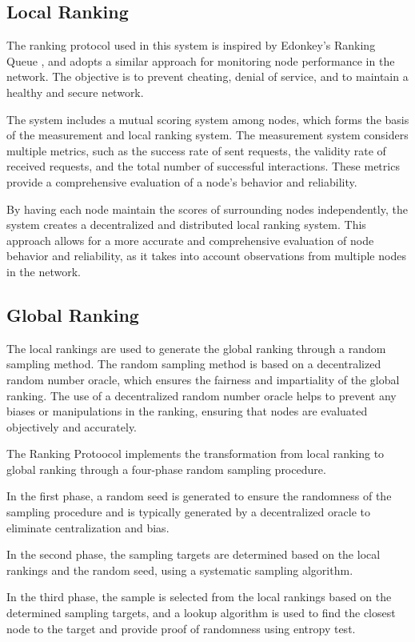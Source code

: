 \documentclass[twocolumn]{article}
\begin{document}
\subsection{Local Ranking}
The ranking protocol used in this system is inspired by Edonkey's Ranking Queue \cite{Edonkey}, and adopts a similar approach for monitoring node performance in the network. The objective is to prevent cheating, denial of service, and to maintain a healthy and secure network.

The system includes a mutual scoring system among nodes, which forms the basis of the measurement and local ranking system. The measurement system considers multiple metrics, such as the success rate of sent requests, the validity rate of received requests, and the total number of successful interactions. These metrics provide a comprehensive evaluation of a node's behavior and reliability.

By having each node maintain the scores of surrounding nodes independently, the system creates a decentralized and distributed local ranking system. This approach allows for a more accurate and comprehensive evaluation of node behavior and reliability, as it takes into account observations from multiple nodes in the network.

\subsection{Global Ranking}
The local rankings are used to generate the global ranking through a random sampling method. The random sampling method is based on a decentralized random number oracle, which ensures the fairness and impartiality of the global ranking. The use of a decentralized random number oracle helps to prevent any biases or manipulations in the ranking, ensuring that nodes are evaluated objectively and accurately.

The Ranking Protoocol implements the transformation from local ranking to global ranking through a four-phase random sampling procedure.

In the first phase, a random seed is generated to ensure the randomness of the sampling procedure and is typically generated by a decentralized oracle to eliminate centralization and bias.

In the second phase, the sampling targets are determined based on the local rankings and the random seed, using a systematic sampling algorithm.

In the third phase, the sample is selected from the local rankings based on the determined sampling targets, and a lookup algorithm is used to find the closest node to the target and provide proof of randomness using entropy test.
\end{document}
